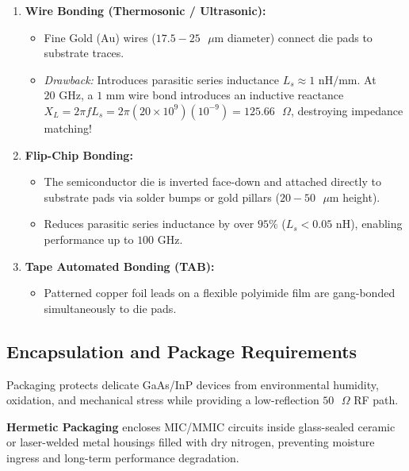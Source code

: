 \documentclass[12pt,a4paper]{article}
\begin{document}
\begin{enumerate}[leftmargin=*, itemsep=5pt]
  \item \textbf{Wire Bonding (Thermosonic / Ultrasonic):}
    \begin{itemize}[leftmargin=*, noitemsep]
      \item Fine Gold ($\text{Au}$) wires ($17.5 - 25\text{ }\mu\text{m}$ diameter) connect die pads to substrate traces.
      \item \textit{Drawback:} Introduces parasitic series inductance $L_s \approx 1\text{ nH/mm}$. At $20\text{ GHz}$, a $1\text{ mm}$ wire bond introduces an inductive reactance $X_L = 2\pi f L_s = 2\pi (20 \times 10^9) (10^{-9}) = 125.66\text{ }\Omega$, destroying impedance matching!
    \end{itemize}
  \item \textbf{Flip-Chip Bonding:}
    \begin{itemize}[leftmargin=*, noitemsep]
      \item The semiconductor die is inverted face-down and attached directly to substrate pads via solder bumps or gold pillars ($20 - 50\text{ }\mu\text{m}$ height).
      \item Reduces parasitic series inductance by over $95\%$ ($L_s < 0.05\text{ nH}$), enabling performance up to $100\text{ GHz}$.
    \end{itemize}
  \item \textbf{Tape Automated Bonding (TAB):}
    \begin{itemize}[leftmargin=*, noitemsep]
      \item Patterned copper foil leads on a flexible polyimide film are gang-bonded simultaneously to die pads.
    \end{itemize}
\end{enumerate}

\subsection{Encapsulation and Package Requirements}
Packaging protects delicate GaAs/InP devices from environmental humidity, oxidation, and mechanical stress while providing a low-reflection $50\text{ }\Omega$ RF path.

\begin{tcolorbox}[defbox, title={Hermetic Packaging}]
  \textbf{Hermetic Packaging} encloses MIC/MMIC circuits inside glass-sealed ceramic or laser-welded metal housings filled with dry nitrogen, preventing moisture ingress and long-term performance degradation.
\end{tcolorbox}
\end{document}
